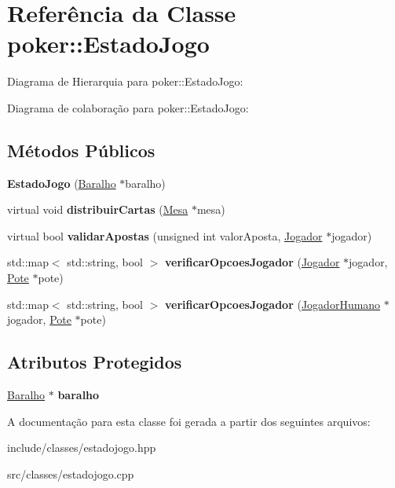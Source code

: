 \hypertarget{classpoker_1_1EstadoJogo}{}\section{Referência da Classe poker\+:\+:Estado\+Jogo}
\label{classpoker_1_1EstadoJogo}


Diagrama de Hierarquia para poker\+:\+:Estado\+Jogo\+:


Diagrama de colaboração para poker\+:\+:Estado\+Jogo\+:
\subsection*{Métodos Públicos}
\begin{DoxyCompactItemize}
\item 
\mbox{\label{classpoker_1_1EstadoJogo_a7fda82edd398a1dc51a68aa8148a094b}} 
{\bfseries Estado\+Jogo} (\hyperlink{classpoker_1_1Baralho}{Baralho} $\ast$baralho)
\item 
\mbox{\label{classpoker_1_1EstadoJogo_a1322e81a9dbf072a3fa552a04923c8ac}} 
virtual void {\bfseries distribuir\+Cartas} (\hyperlink{classpoker_1_1Mesa}{Mesa} $\ast$mesa)
\item 
\mbox{\label{classpoker_1_1EstadoJogo_a68c22b8817b072058e7c8df9d5b6ab40}} 
virtual bool {\bfseries validar\+Apostas} (unsigned int valor\+Aposta, \hyperlink{classpoker_1_1Jogador}{Jogador} $\ast$jogador)
\item 
\mbox{\label{classpoker_1_1EstadoJogo_a36f215e4a99057fb19b34c37706d228c}} 
std\+::map$<$ std\+::string, bool $>$ {\bfseries verificar\+Opcoes\+Jogador} (\hyperlink{classpoker_1_1Jogador}{Jogador} $\ast$jogador, \hyperlink{classpoker_1_1Pote}{Pote} $\ast$pote)
\item 
\mbox{\label{classpoker_1_1EstadoJogo_a1f68586dea29cf90d82f1f5f96747b80}} 
std\+::map$<$ std\+::string, bool $>$ {\bfseries verificar\+Opcoes\+Jogador} (\hyperlink{classpoker_1_1JogadorHumano}{Jogador\+Humano} $\ast$jogador, \hyperlink{classpoker_1_1Pote}{Pote} $\ast$pote)
\end{DoxyCompactItemize}
\subsection*{Atributos Protegidos}
\begin{DoxyCompactItemize}
\item 
\mbox{\label{classpoker_1_1EstadoJogo_a10a4cdd75bccb4f16186175077587a31}} 
\hyperlink{classpoker_1_1Baralho}{Baralho} $\ast$ {\bfseries baralho}
\end{DoxyCompactItemize}


A documentação para esta classe foi gerada a partir dos seguintes arquivos\+:\begin{DoxyCompactItemize}
\item 
include/classes/estadojogo.\+hpp\item 
src/classes/estadojogo.\+cpp\end{DoxyCompactItemize}

